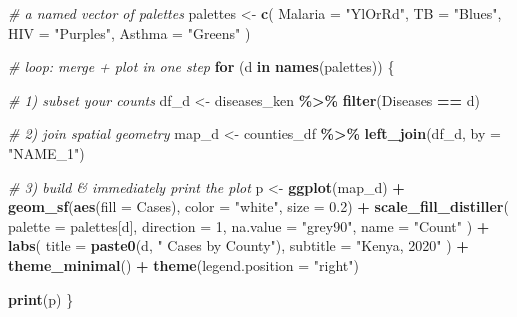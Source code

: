 \documentclass[
]{article}
\newenvironment{Shaded}{\begin{snugshade}}{\end{snugshade}}
\newcommand{\AttributeTok}[1]{\textcolor[rgb]{0.13,0.29,0.53}{#1}}
\newcommand{\CommentTok}[1]{\textcolor[rgb]{0.56,0.35,0.01}{\textit{#1}}}
\newcommand{\ControlFlowTok}[1]{\textcolor[rgb]{0.13,0.29,0.53}{\textbf{#1}}}
\newcommand{\DecValTok}[1]{\textcolor[rgb]{0.00,0.00,0.81}{#1}}
\newcommand{\FloatTok}[1]{\textcolor[rgb]{0.00,0.00,0.81}{#1}}
\newcommand{\FunctionTok}[1]{\textcolor[rgb]{0.13,0.29,0.53}{\textbf{#1}}}
\newcommand{\NormalTok}[1]{#1}
\newcommand{\OtherTok}[1]{\textcolor[rgb]{0.56,0.35,0.01}{#1}}
\newcommand{\SpecialCharTok}[1]{\textcolor[rgb]{0.81,0.36,0.00}{\textbf{#1}}}
\newcommand{\StringTok}[1]{\textcolor[rgb]{0.31,0.60,0.02}{#1}}
\begin{document}
\begin{Shaded}
\begin{Highlighting}[]
\CommentTok{\# a named vector of palettes}
\NormalTok{palettes }\OtherTok{\textless{}{-}} \FunctionTok{c}\NormalTok{(}
  \AttributeTok{Malaria =} \StringTok{"YlOrRd"}\NormalTok{,}
  \AttributeTok{TB      =} \StringTok{"Blues"}\NormalTok{,}
  \AttributeTok{HIV     =} \StringTok{"Purples"}\NormalTok{,}
  \AttributeTok{Asthma  =} \StringTok{"Greens"}
\NormalTok{)}

\CommentTok{\# loop: merge + plot in one step}
\ControlFlowTok{for}\NormalTok{ (d }\ControlFlowTok{in} \FunctionTok{names}\NormalTok{(palettes)) \{}
  
  \CommentTok{\# 1) subset your counts  }
\NormalTok{  df\_d }\OtherTok{\textless{}{-}}\NormalTok{ diseases\_ken }\SpecialCharTok{\%\textgreater{}\%} 
    \FunctionTok{filter}\NormalTok{(Diseases }\SpecialCharTok{==}\NormalTok{ d)}
  
  \CommentTok{\# 2) join spatial geometry  }
\NormalTok{  map\_d }\OtherTok{\textless{}{-}}\NormalTok{ counties\_df }\SpecialCharTok{\%\textgreater{}\%} 
    \FunctionTok{left\_join}\NormalTok{(df\_d, }\AttributeTok{by =} \StringTok{"NAME\_1"}\NormalTok{)}
  
  \CommentTok{\# 3) build \& immediately print the plot  }
\NormalTok{  p }\OtherTok{\textless{}{-}} \FunctionTok{ggplot}\NormalTok{(map\_d) }\SpecialCharTok{+}
    \FunctionTok{geom\_sf}\NormalTok{(}\FunctionTok{aes}\NormalTok{(}\AttributeTok{fill =}\NormalTok{ Cases), }\AttributeTok{color =} \StringTok{"white"}\NormalTok{, }\AttributeTok{size =} \FloatTok{0.2}\NormalTok{) }\SpecialCharTok{+}
    \FunctionTok{scale\_fill\_distiller}\NormalTok{(}
      \AttributeTok{palette   =}\NormalTok{ palettes[d],}
      \AttributeTok{direction =} \DecValTok{1}\NormalTok{,}
      \AttributeTok{na.value  =} \StringTok{"grey90"}\NormalTok{,}
      \AttributeTok{name      =} \StringTok{"Count"}
\NormalTok{    ) }\SpecialCharTok{+}
    \FunctionTok{labs}\NormalTok{(}
      \AttributeTok{title    =} \FunctionTok{paste0}\NormalTok{(d, }\StringTok{" Cases by County"}\NormalTok{),}
      \AttributeTok{subtitle =} \StringTok{"Kenya, 2020"}
\NormalTok{    ) }\SpecialCharTok{+}
    \FunctionTok{theme\_minimal}\NormalTok{() }\SpecialCharTok{+}
    \FunctionTok{theme}\NormalTok{(}\AttributeTok{legend.position =} \StringTok{"right"}\NormalTok{)}
  
  \FunctionTok{print}\NormalTok{(p)}
\NormalTok{\}}
\end{Highlighting}
\end{Shaded}
\end{document}
